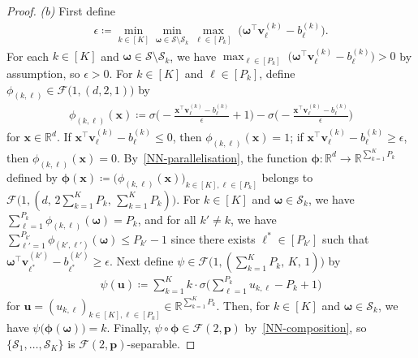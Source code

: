 \documentclass[12pt]{article}
\begin{document}
\begin{proof}
    \medskip \emph{(b)} First define
    \begin{align*}
        \epsilon \coloneqq \min_{k\in[K]} \min_{\bm\omega \in \mathcal{S} \setminus \mathcal{S}_k} \max_{\ell\in[P_k]} \;\bigl(\bm\omega^\top \bm v^{(k)}_{\ell} - b^{(k)}_{\ell}\bigr).
    \end{align*}
    For each $k\in[K]$ and $\bm\omega \in \mathcal{S} \setminus \mathcal{S}_k$, we have $\max_{\ell\in[P_k]} \;\bigl(\bm\omega^\top \bm v^{(k)}_{\ell} - b^{(k)}_{\ell}\bigr) > 0$ by assumption, so $\epsilon > 0$.  For $k\in[K]$ and $\ell\in[P_k]$, define $\phi_{(k,\ell)} \in \mathcal{F}\bigl(1,(d,2,1)\bigr)$ by 
    \begin{align*}
        \phi_{(k,\ell)}(\bm x) \coloneqq \sigma\biggl(-\frac{\bm x^\top \bm v^{(k)}_{\ell} - b^{(k)}_{\ell}}{\epsilon} + 1\biggr) - \sigma\biggl(-\frac{\bm x^\top \bm v^{(k)}_{\ell} - b^{(k)}_{\ell}}{\epsilon}\biggr)
    \end{align*}
    for $\bm x\in\mathbb{R}^d$. If $\bm x^\top \bm v^{(k)}_{\ell} - b^{(k)}_{\ell} \leq 0$, then $\phi_{(k,\ell)}(\bm x) = 1$; if $\bm x^\top \bm v^{(k)}_{\ell} - b^{(k)}_{\ell} \geq \epsilon$, then $\phi_{(k,\ell)}(\bm x) = 0$. By~\ref{NN-parallelisation}, the function $\bm\phi: \mathbb{R}^d \to \mathbb{R}^{\sum_{k=1}^K P_k}$ defined by $\bm \phi(\bm x) \coloneqq \bigl(\phi_{(k,\ell)}(\bm x)\bigr)_{k\in[K],\ell\in[P_k]}$ belongs to $\mathcal{F}\bigl(1,(d,\, 2\sum_{k=1}^K P_k,\, \sum_{k=1}^K P_k)\bigr)$. For $k\in[K]$ and $\bm\omega \in \mathcal{S}_k$, we have $\sum_{\ell=1}^{P_k} \phi_{(k,\ell)}(\bm\omega) = P_k$, and for all $k'\neq k$, we have $\sum_{\ell'=1}^{P_{k'}} \phi_{(k',\ell')}(\bm\omega) \leq P_{k'}-1$ since there exists $\ell^* \in [P_{k'}]$ such that $\bm\omega^\top \bm v^{(k')}_{\ell^*} - b^{(k')}_{\ell^*} \geq \epsilon$. Next define $\psi \in \mathcal{F}\bigl(1,(\sum_{k=1}^K P_k,\, K,\, 1)\bigr)$ by
    \begin{align*}
        \psi(\bm u) \coloneqq \sum_{k=1}^K k \cdot\sigma\biggl(\sum_{\ell=1}^{P_k} u_{k,\ell} - P_k + 1\biggr)
    \end{align*}
    for $\bm u = (u_{k,\ell})_{k\in[K], \ell\in[P_k]} \in \mathbb{R}^{\sum_{k=1}^K P_k}$. Then, for $k\in[K]$ and $\bm\omega \in \mathcal{S}_k$, we have $\psi\bigl(\bm\phi(\bm\omega)\bigr) = k$. Finally, $\psi\circ\bm\phi \in \mathcal{F}(2,\bm p)$ by~\ref{NN-composition}, so $\{\mathcal{S}_1,\ldots,\mathcal{S}_K\}$ is $\mathcal{F}(2,\bm p)$-separable.
\end{proof}
\end{document}

